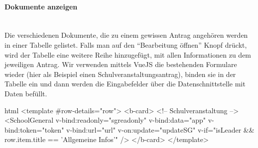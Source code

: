 \paragraph{Dokumente anzeigen}
~\\
Die verschiedenen Dokumente, die zu einem gewissen Antrag angehören werden in einer Tabelle gelistet. Falls man auf den \enquote{Bearbeitung öffnen} Knopf drückt, wird der Tabelle eine weitere Reihe hinzugefügt, mit allen Informationen zu dem jeweiligen Antrag. Wir verwenden mittels VueJS die bestehenden Formulare wieder (hier als Beispiel einen Schulveranstaltungsantrag), binden sie in der Tabelle ein und dann werden die Eingabefelder über die Datenschnittstelle mit Daten befüllt.
\begin{code}{html}
	<template #row-details="row">
        <b-card>
            <!-- Schulveranstaltung -->
            <SchoolGeneral
            v-bind:readonly="sgreadonly"
            v-bind:data="app"
            v-bind:token="token"
            v-bind:url="url"
            v-on:update="updateSG"
            v-if="isLeader && row.item.title == 'Allgemeine Infos'"
            />
		</b-card>
	</template>
\end{code}
	\label{list:docanz} ~\\

